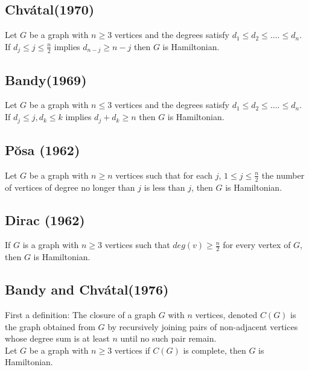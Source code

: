     \subsection{Chv\'{a}tal(1970)}
  Let $G$ be a graph with $n \geq 3$ vertices and the degrees satisfy $d_{1} \leq d_{2} \leq .... \leq d_{n}$. If $d_{j} \leq j \leq \frac{n}{2}$ implies $d_{n-j} \geq n - j$ then $G$ is Hamiltonian.
    
    \subsection{Bandy(1969)}
  Let $G$ be a graph with $n \leq 3$ vertices and the degrees satisfy $d_{1} \leq d_{2} \leq .... \leq d_{n}$. If $d_{j} \leq j, d_{k} \leq k$ implies $d_{j} + d_{k} \geq n$ then $G$ is Hamiltonian.
    
    \subsection{P\u{o}sa (1962)}
  Let $G$ be a graph with $n \geq n$ vertices such that for each $j$, $1 \leq j \leq \frac{n}{2}$ the number of vertices of degree no longer than $j$ is less than $j$, then $G$ is Hamiltonian.
    
    \subsection{Dirac (1962)}
  If $G$ is a graph with $n \geq 3$ vertices such that $deg(v) \geq \frac{n}{2}$ for every vertex of $G$, then $G$ is Hamiltonian.
    
    \subsection{Bandy and Chv\'{a}tal(1976)}
  First a definition: The closure of a graph $G$ with $n$ vertices, denoted $C(G)$ is the graph obtained from $G$ by recursively joining pairs of non-adjacent vertices whose degree sum is at least $n$ until no such pair remain.\\
    Let $G$ be a graph with $n \geq 3$ vertices if $C(G)$ is complete, then $G$ is Hamiltonian.



